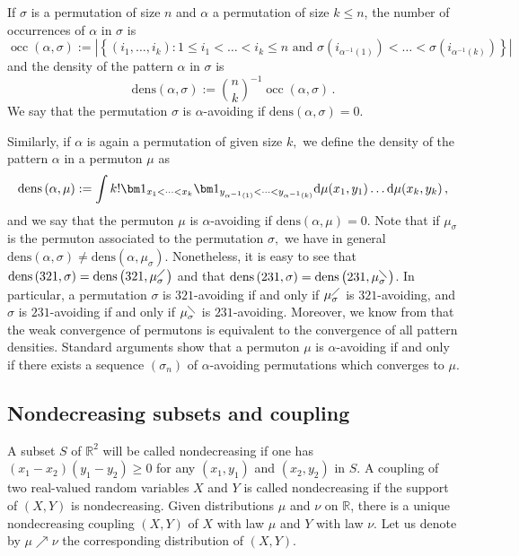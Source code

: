 \documentclass[a4paper,11pt]{amsart}
\newcommand{\dd}{\textup{d}}
\newcommand{\dens}[2]{\mathrm{dens}\left(#1,#2\right)}
\newcommand{\card}[1]{\left|\left\{ #1 \right\}\right|}
\newcommand{\One}{\bm 1}
\DeclareMathOperator{\occ}{occ}
\DeclareMathOperator{\Sample}{Sample}
\theoremstyle{definition}
\begin{document}
If $\sigma$ is a permutation of size $n$ and $\alpha$ a permutation of size $k \le n$, the number of occurrences of $\alpha$ in $\sigma$ is
\[
    \occ(\alpha, \sigma) := \card{ (i_1, \dots, i_k) : 1\le i_1< \dots< i_k\le n \mbox{ and } \sigma(i_{\alpha^{-1}(1)})< \dots< \sigma(i_{\alpha^{-1}(k)}) }
\]
and the density of the pattern $\alpha$ in $\sigma$ is
\[
    \dens{\alpha}{\sigma} := \binom{n}{k}^{-1} \occ(\alpha, \sigma) \,.
\]
We say that the permutation $\sigma$ is $\alpha$-avoiding if $\dens{\alpha}{\sigma}=0$.

Similarly, if $\alpha$ is again a permutation of given size $k,$ we define the density of the pattern $\alpha$ in a permuton $\mu$ as
\[
    \dens{\alpha}{\mu} := \int k! \One_{x_1< \dots< x_k} \One_{y_{\alpha^{-1}(1)}< \dots< y_{\alpha^{-1}(k)}} \dd\mu(x_1, y_1) \dots \dd\mu(x_k, y_k) \,,
\]
and we say that the permuton $\mu$ is $\alpha$-avoiding if $\dens{\alpha}{\mu}=0$.
Note that if $\mu_\sigma$ is the permuton associated to the permutation $\sigma,$ we have in general $\dens{\alpha}{\sigma} \neq \dens{\alpha}{ \mu_\sigma}$. Nonetheless, it is easy to see that $\dens{321}{\sigma} = \dens{321}{\mu^\diagup_\sigma}$ and that $\dens{231}{\sigma} = \dens{231}{\mu^\diagdown_\sigma}$.
In particular, a permutation $\sigma$ is $321$-avoiding if and only if $\mu_\sigma^\diagup$ is $321$-avoiding, and $\sigma$ is $231$-avoiding if and only if $\mu_\sigma^\diagdown$ is $231$-avoiding.
Moreover, we know from \cite{Permutons} that the weak convergence of permutons is equivalent to the convergence of all pattern densities. 
Standard arguments show that a permuton $\mu$ is $\alpha$-avoiding if and only if there exists a sequence $(\sigma_n)$ of $\alpha$-avoiding permutations which converges to $\mu$.



\subsection{Nondecreasing subsets and coupling}
\label{ssec: nondecreasing subsets and coupling}

A subset $S$ of $\mathbb R^2$ will be called nondecreasing if one has $(x_1-x_2)(y_1-y_2) \ge 0$
for any $(x_1,y_1)$ and $(x_2,y_2)$ in $S$.
A coupling of two real-valued random variables $X$ and $Y$ is called nondecreasing
if the support of $(X,Y)$ is nondecreasing.
Given distributions $\mu$ and $\nu$ on $\mathbb R$, 
there is a unique nondecreasing coupling $(X,Y)$ of $X$ with law $\mu$ and $Y$ with law $\nu$.
Let us denote by $\mu \nearrow \nu$ the corresponding distribution of $(X,Y)$.
\end{document}
